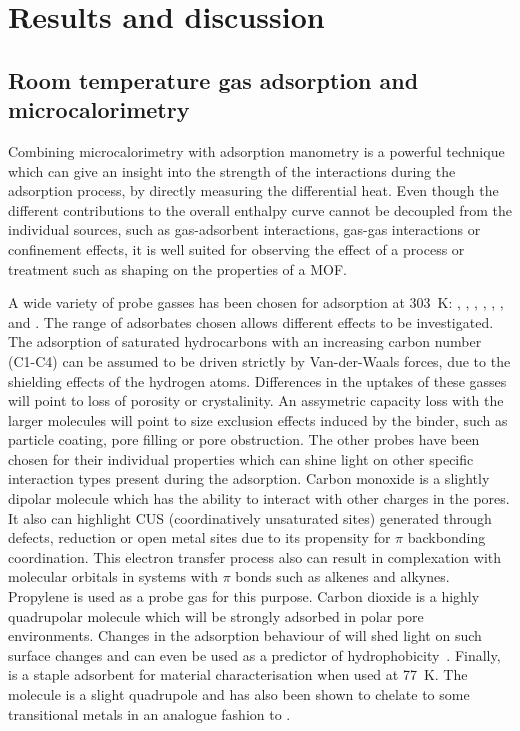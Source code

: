 
\section{Results and discussion}





\subsection{Room temperature gas adsorption and microcalorimetry}

Combining microcalorimetry with adsorption manometry is a powerful technique which can
give an insight into the strength of the interactions during the adsorption process,
by directly measuring the differential heat. Even though the different contributions 
to the overall enthalpy curve cannot be decoupled from the individual sources, 
such as gas-adsorbent interactions, gas-gas interactions or confinement effects, it 
is well suited for observing the effect of a process or treatment such as shaping
on the properties of a MOF.

A wide variety of probe gasses has been chosen for adsorption at \SI{303}{\kelvin}:
, , , , , ,  and .
The range of adsorbates chosen allows different effects to be investigated.
The adsorption of saturated hydrocarbons with an increasing carbon number (C1-C4) can be
assumed to be driven strictly by Van-der-Waals forces, due to the shielding effects 
of the hydrogen atoms. Differences in the uptakes of these gasses will point to 
loss of porosity or crystalinity. An assymetric capacity loss with the larger molecules 
will point to size exclusion effects induced by the binder, such as particle coating,
pore filling or pore obstruction.
The other probes have been chosen for their 
individual properties which can shine light on other specific interaction types 
present during the adsorption. 
Carbon monoxide is a slightly dipolar molecule which has the ability to interact with
other charges in the pores. It also can highlight CUS (coordinatively unsaturated sites)
generated through defects, reduction or open metal sites due to its
propensity for \( \pi \) backbonding coordination.
This electron transfer process also can result in complexation with molecular 
orbitals in systems with \( \pi \) bonds such as alkenes and alkynes. Propylene is used 
as a probe gas for this purpose.
Carbon dioxide is a highly quadrupolar molecule which will be strongly adsorbed in 
polar pore environments. Changes in the adsorption behaviour of  will shed 
light on such surface changes and can even be used as a predictor of 
hydrophobicity~\cite{chanutScreeningEffectWater2017}.
Finally,  is a staple adsorbent for material characterisation when used at
\SI{77}{\kelvin}. The molecule is a slight quadrupole and has also been shown to 
chelate to some transitional metals in an analogue fashion to .

